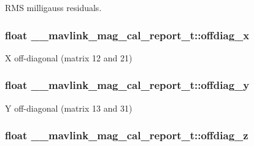 R\+M\+S milligauss residuals. 

\hypertarget{struct____mavlink__mag__cal__report__t_a5cff5f77e3fdb317371d64879a3547f3}{
\subsubsection[{offdiag\+\_\+x}]{\setlength{\rightskip}{0pt plus 5cm}float \+\_\+\+\_\+mavlink\+\_\+mag\+\_\+cal\+\_\+report\+\_\+t\+::offdiag\+\_\+x}}\label{struct____mavlink__mag__cal__report__t_a5cff5f77e3fdb317371d64879a3547f3}


X off-\/diagonal (matrix 12 and 21) 

\hypertarget{struct____mavlink__mag__cal__report__t_a0d9ef13c28fc15a5f3ea354cc1150a36}{
\subsubsection[{offdiag\+\_\+y}]{\setlength{\rightskip}{0pt plus 5cm}float \+\_\+\+\_\+mavlink\+\_\+mag\+\_\+cal\+\_\+report\+\_\+t\+::offdiag\+\_\+y}}\label{struct____mavlink__mag__cal__report__t_a0d9ef13c28fc15a5f3ea354cc1150a36}


Y off-\/diagonal (matrix 13 and 31) 

\hypertarget{struct____mavlink__mag__cal__report__t_a4b4d3694a42168a039dc0fc0db7e0c42}{
\subsubsection[{offdiag\+\_\+z}]{\setlength{\rightskip}{0pt plus 5cm}float \+\_\+\+\_\+mavlink\+\_\+mag\+\_\+cal\+\_\+report\+\_\+t\+::offdiag\+\_\+z}}\label{struct____mavlink__mag__cal__report__t_a4b4d3694a42168a039dc0fc0db7e0c42}


